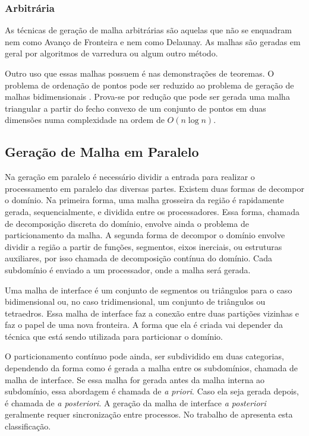 \subsubsection{Arbitrária}

As técnicas de geração de malha arbitrárias são aquelas que não se enquadram nem como Avanço de Fronteira e nem como Delaunay. As malhas são geradas em geral por algoritmos de varredura ou algum outro método.

Outro uso que essas malhas possuem é nas demonstrações de teoremas. O problema de ordenação de pontos pode ser reduzido ao problema de geração de malhas bidimensionais \cite{bib:Carvalho91}. Prova-se por redução que pode ser gerada uma malha triangular a partir do fecho convexo de um conjunto de pontos em duas dimensões numa complexidade na ordem de $O (n \log n)$.

\subsection{Geração de Malha em Paralelo}\label{Geração de Malha em Paralelo}

Na geração em paralelo é necessário dividir a entrada para realizar o processamento em paralelo das diversas partes. Existem duas formas de decompor o domínio. Na primeira forma, uma malha grosseira da região é rapidamente gerada, sequencialmente, e dividida entre os processadores. Essa forma, chamada de decomposição discreta do domínio, envolve ainda o problema de particionamento da malha. A segunda forma de decompor o domínio envolve dividir a região a partir de funções, segmentos, eixos inerciais, ou estruturas auxiliares, por isso chamada de decomposição contínua do domínio. Cada subdomínio é enviado a um processador, onde a malha será gerada.

Uma malha de interface é um conjunto de segmentos ou triângulos para o caso bidimensional ou, no caso tridimensional, um conjunto de triângulos ou tetraedros. Essa malha de interface faz a conexão entre duas partições vizinhas e faz o papel de uma nova fronteira. A forma que ela é criada vai depender da técnica que está sendo utilizada para particionar o domínio.

O particionamento contínuo pode ainda, ser subdividido em duas categorias, dependendo da forma como é gerada a malha entre os subdomínios, chamada de malha de interface. Se essa malha for gerada antes da malha interna ao subdomínio, essa abordagem é chamada de \textit{a priori}. Caso ela seja gerada depois, é chamada de \textit{a posteriori}. A geração da malha de interface \textit{a posteriori} geralmente requer sincronização entre processos. No trabalho de \cite{bib:deCougny99} apresenta esta classificação.


